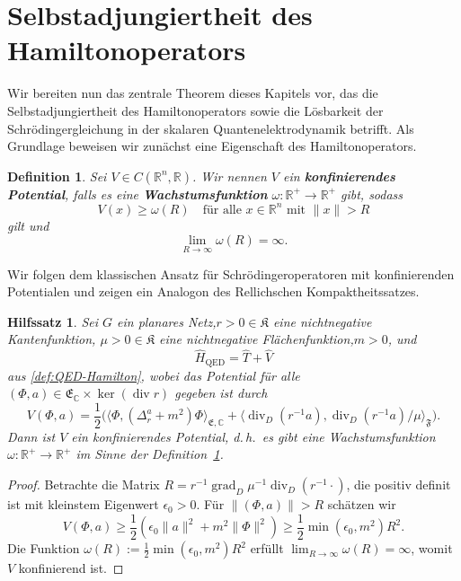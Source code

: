 \documentclass[11pt,a4paper,leqno]{report}
\newtheorem{lemma}[theorem]{Hilfssatz}
\newtheorem{definition}[theorem]{Definition}
\numberwithin{equation}{chapter}
\begin{document}
\section{Selbstadjungiertheit des Hamiltonoperators}
Wir bereiten nun das zentrale Theorem dieses Kapitels vor, das die Selbstadjungiertheit des Hamiltonoperators sowie die Lösbarkeit der Schrödingergleichung in der skalaren Quantenelektrodynamik betrifft. Als Grundlage beweisen wir zunächst eine Eigenschaft des Hamiltonoperators.
\begin{definition}\label{def:konf-pot}
	Sei $V \in C(\mathbb{R}^n, \mathbb{R})$. Wir nennen $V$ ein \textbf{konfinierendes Potential}, falls es eine \textbf{Wachstumsfunktion} $\omega: \mathbb{R}^+ \to \mathbb{R}^+$ gibt, sodass
	\begin{equation}
		V(x) \ge \omega(R) \quad \text{für alle } x \in \mathbb{R}^n \text{ mit } \|x\| > R
	\end{equation}
	gilt und
	\begin{equation}
		\lim_{R \to \infty} \omega(R) = \infty.
	\end{equation}
\end{definition}
\noindent
Wir folgen dem klassischen Ansatz für Schrödingeroperatoren mit konfinierenden Potentialen und zeigen ein Analogon des Rellichschen Kompaktheitssatzes.
\begin{lemma}
	Sei $G$ ein planares Netz,\(r>0\in\mathfrak{K}\) eine nichtnegative Kantenfunktion, \(\mu>0\in\mathfrak{K}\) eine nichtnegative Flächenfunktion,$m>0$, und
	\[
	\hat{H}_\text{QED} = \hat{T} + \hat{V}
	\]
	aus \eqref{def:QED-Hamilton}, wobei das Potential für alle $(\Phi, a) \in \mathfrak{E}_\mathbb{C} \times \ker(\operatorname{div} r)$ gegeben ist durch
	\begin{equation*}
		V(\Phi, a) = \frac{1}{2} \Biggl( \bigl\langle \Phi, (\Delta_r^a + m^2) \Phi \bigr\rangle_{\mathfrak{E},\mathbb{C}} + \bigl\langle \operatorname{div}_D(r^{-1} a), \operatorname{div}_D(r^{-1} a)/\mu \bigr\rangle_{\mathfrak{F}} \Biggr).
	\end{equation*}
	Dann ist $V$ ein konfinierendes Potential, d.\,h.\ es gibt eine Wachstumsfunktion $\omega: \mathbb{R}^+ \to \mathbb{R}^+$ im Sinne der Definition~\ref{def:konf-pot}.
\end{lemma}
\begin{proof}
	Betrachte die Matrix $R = r^{-1} \operatorname{grad}_D \mu^{-1} \operatorname{div}_D (r^{-1} \cdot)$, die positiv definit ist mit kleinstem Eigenwert $\epsilon_0 > 0$. Für $\|(\Phi, a)\| > R$ schätzen wir
	\[
	V(\Phi, a) \ge \frac{1}{2} (\epsilon_0 \|a\|^2 + m^2 \|\Phi\|^2) \ge \frac{1}{2} \min(\epsilon_0, m^2) R^2.
	\]
	Die Funktion $\omega(R) := \frac{1}{2} \min(\epsilon_0, m^2) R^2$ erfüllt $\lim_{R \to \infty} \omega(R) = \infty$, womit $V$ konfinierend ist.
\end{proof}
\end{document}

